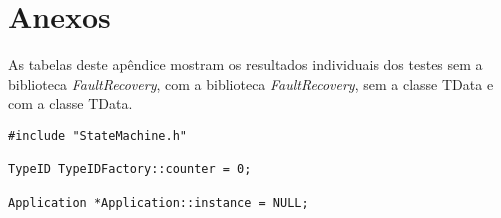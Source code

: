 
\chapter{Anexos} \label{App:ApendiceA}

As tabelas deste apêndice mostram os resultados individuais dos testes sem a biblioteca \textit{FaultRecovery}, com a biblioteca \textit{FaultRecovery}, sem a classe TData e com a classe TData.



\begin{lstlisting}
#include "StateMachine.h"

TypeID TypeIDFactory::counter = 0;

Application *Application::instance = NULL;
\end{lstlisting}

